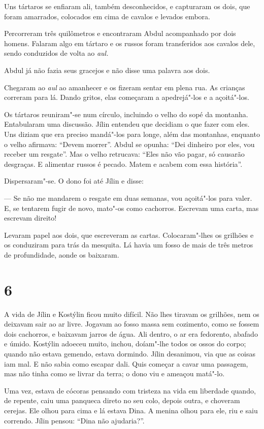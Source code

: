 Uns tártaros se enfiaram ali, também desconhecidos, e capturaram os
dois, que foram amarrados, colocados em cima de cavalos e levados
embora.

Percorreram três quilômetros e encontraram Abdul acompanhado por dois
homens. Falaram algo em tártaro e os russos foram transferidos aos cavalos dele, sendo conduzidos de volta ao \emph{aul.}

Abdul já não fazia seus gracejos e não disse uma palavra aos dois.

Chegaram ao \emph{aul} ao amanhecer e os fizeram sentar em plena rua. As
crianças correram para lá. Dando gritos, elas começaram a apedrejá"-los e
a açoitá"-los.

Os tártaros reuniram"-se num círculo, incluindo o velho do sopé da
montanha. Entabularam uma discussão. Jílin entendeu que decidiam o que
fazer com eles. Uns diziam que era preciso mandá"-los para longe, além
das montanhas, enquanto o velho afirmava: ``Devem morrer''. Abdul se
opunha: ``Dei dinheiro por eles, vou receber um resgate''. Mas o velho
retrucava: ``Eles não vão pagar, só causarão desgraças. E alimentar
russos é pecado. Matem e acabem com essa história''.

Dispersaram"-se. O dono foi até Jílin e disse:

--- Se não me mandarem o resgate em duas semanas, vou açoitá"-los para
valer. E, se tentarem fugir de novo, mato"-os como cachorros. Escrevam
uma carta, mas escrevam direito!

Levaram papel aos dois, que escreveram as cartas. Colocaram"-lhes os
grilhões e os conduziram para trás da mesquita. Lá havia um fosso de
mais de três metros de profundidade, aonde os baixaram.

\section{6}

A vida de Jílin e Kostýlin ficou muito difícil. Não lhes tiravam os
grilhões, nem os deixavam sair ao ar livre. Jogavam ao fosso massa sem
cozimento, como se fossem dois cachorros, e baixavam jarros de água. Ali
dentro, o ar era fedorento, abafado e úmido. Kostýlin adoeceu muito,
inchou, doíam"-lhe todos os ossos do corpo; quando não estava gemendo,
estava dormindo. Jílin desanimou, via que as coisas iam mal. E não sabia
como escapar dali. Quis começar a cavar uma passagem, mas não tinha como
se livrar da terra; o dono viu e ameaçou matá"-lo.

Uma vez, estava de cócoras pensando com tristeza na vida em liberdade
quando, de repente, caiu uma panqueca direto no seu colo, depois outra,
e choveram cerejas. Ele olhou para cima e lá estava Dina. A menina olhou para
ele, riu e saiu correndo. Jílin pensou: ``Dina não ajudaria?''.

